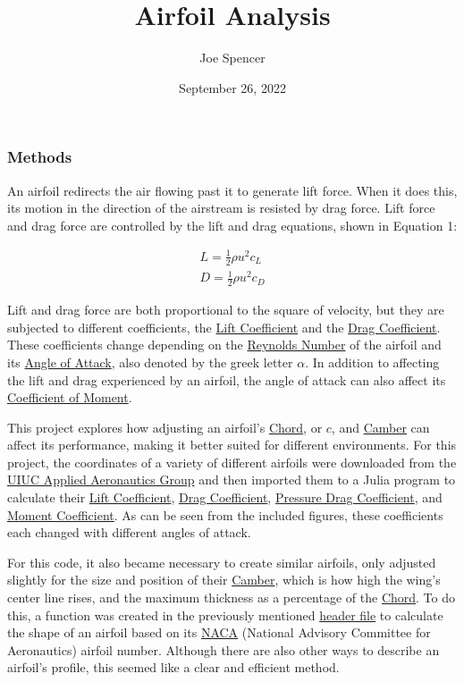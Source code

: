 \documentclass{article}
\begin{document}
\author{Joe Spencer}
\title{Airfoil Analysis}
\date{September 26, 2022}
\maketitle

\subsubsection*{Methods}

An airfoil redirects the air flowing past it to generate lift force. When it does this, its motion in the direction of the airstream is resisted by drag force. Lift force and drag force are controlled by the lift and drag equations, shown in Equation 1:

\begin{equation} \label{eq:1}
\begin{aligned}
        	L = \frac{1}{2} \rho u^{2} c_{L} \\
        	D = \frac{1}{2} \rho u^{2} c_{D}
\end{aligned}
\end{equation}
	
Lift and drag force are both proportional to the square of velocity, but they are subjected to different coefficients, the \hyperlink{CL}{Lift Coefficient} and the \hyperlink{CD}{Drag Coefficient}. These coefficients change depending on the \hyperlink{Re}{Reynolds Number} of the airfoil and its \hyperlink{alpha}{Angle of Attack}, also denoted by the greek letter $\alpha$. In addition to affecting the lift and drag experienced by an airfoil, the angle of attack can also affect its \hyperlink{CM}{Coefficient of Moment}.\newline

This project explores how adjusting an airfoil's \hyperlink{c}{Chord}, or $c$, and \hyperlink{Camber}{Camber} can affect its performance, making it better suited for different environments. For this project, the coordinates of a variety of different airfoils were downloaded from the \href{https://m-selig.ae.illinois.edu/ads.html}{UIUC Applied Aeronautics Group} and then imported them to a Julia program to calculate their \hyperlink{CL}{Lift Coefficient}, \hyperlink{CD}{Drag Coefficient}, \hyperlink{DP}{Pressure Drag Coefficient}, and \hyperlink{CM}{Moment Coefficient}. As can be seen from the included figures, these coefficients each changed with different angles of attack.\newline

For this code, it also became necessary to create similar airfoils, only adjusted slightly for the size and position of their \hyperlink{Camber}{Camber}, which is how high the wing's center line rises, and the maximum thickness as a percentage of the \hyperlink{c}{Chord}. To do this, a function was created in the previously mentioned \href{https://github.com/JoeSpencer1/497R-Projects/blob/Airfoil-Analysis/Airfoil_Functions.jl}{header file} to calculate the shape of an airfoil based on its \hyperlink{NACA}{NACA} (National Advisory Committee for Aeronautics) airfoil number. Although there are also other ways to describe an airfoil's profile, this seemed like a clear and efficient method. \newline
\end{document}
